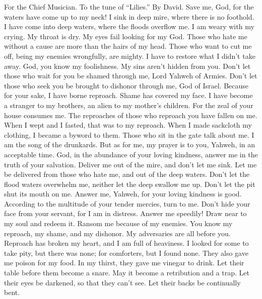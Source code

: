 For the Chief Musician. To the tune of ``Lilies.'' By David.
 Save me, God, for the waters have come up to my neck!
 I sink in deep mire, where there is no foothold. I have
come into deep waters, where the floods overflow me.  I am
weary with my crying. My throat is dry. My eyes fail looking for my God.
 Those who hate me without a cause are more than the hairs
of my head. Those who want to cut me off, being my enemies wrongfully,
are mighty. I have to restore what I didn't take away. 
God, you know my foolishness. My sins aren't hidden from you.
 Don't let those who wait for you be shamed through me,
Lord Yahweh of Armies. Don't let those who seek you be brought to
dishonor through me, God of Israel.  Because for your
sake, I have borne reproach. Shame has covered my face.  I
have become a stranger to my brothers, an alien to my mother's children.
 For the zeal of your house consumes me. The reproaches of
those who reproach you have fallen on me.  When I wept
and I fasted, that was to my reproach.  When I made
sackcloth my clothing, I became a byword to them.  Those
who sit in the gate talk about me. I am the song of the drunkards.
 But as for me, my prayer is to you, Yahweh, in an
acceptable time. God, in the abundance of your loving kindness, answer
me in the truth of your salvation.  Deliver me out of the
mire, and don't let me sink. Let me be delivered from those who hate me,
and out of the deep waters.  Don't let the flood waters
overwhelm me, neither let the deep swallow me up. Don't let the pit shut
its mouth on me.  Answer me, Yahweh, for your loving
kindness is good. According to the multitude of your tender mercies,
turn to me.  Don't hide your face from your servant, for
I am in distress. Answer me speedily!  Draw near to my
soul and redeem it. Ransom me because of my enemies.  You
know my reproach, my shame, and my dishonor. My adversaries are all
before you.  Reproach has broken my heart, and I am full
of heaviness. I looked for some to take pity, but there was none; for
comforters, but I found none.  They also gave me poison
for my food. In my thirst, they gave me vinegar to drink.
 Let their table before them become a snare. May it
become a retribution and a trap.  Let their eyes be
darkened, so that they can't see. Let their backs be continually bent.
